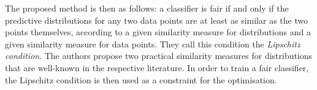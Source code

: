 The proposed method is then as follows: a classifier is fair
if and only if the predictive distributions for any two data points
are at least as similar as the two points themselves,
according to a given similarity measure for distributions
and a given similarity measure for data points.
They call this condition the \emph{Lipschitz condition}.
The authors propose two practical similarity measures for distributions
that are well-known in the respective literature.
In order to train a fair classifier,
the Lipschitz condition is then used as a constraint for the optimisation.



